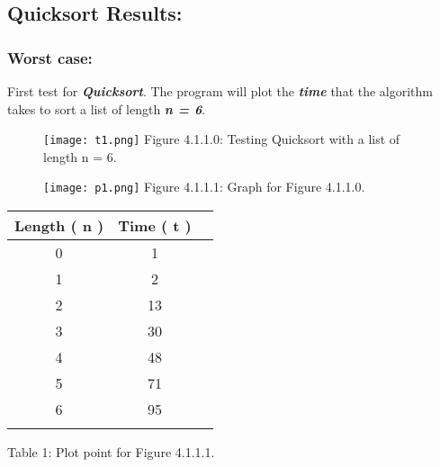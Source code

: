 \subsection{Quicksort Results:}

\subsubsection{Worst case:}

First test for {\bfseries\itshape Quicksort}. The program will plot the {\bfseries\itshape time} that the algorithm takes to sort a list of length {\bfseries\itshape n = 6}. \hfill \break

{\bfseries\itshape\color{armygreen}{Observation:}} {\itshape\color{armygreen}{We are going to analyze the worst case when the list it's sorted in decreasing order.}} \hfill \break

\begin{figure}[H]
\texttt{[image: t1.png]}
\centering \linebreak \linebreak Figure 4.1.1.0: Testing Quicksort with a list of length n = 6.
\end{figure} \hfill 

\begin{multicols}{2}
\begin{figure}[H]
\texttt{[image: p1.png]}
\centering \linebreak \linebreak Figure 4.1.1.1: Graph for Figure 4.1.1.0.
\end{figure} \hfill

\begin{center}
\begin{itemize}

\end{itemize}
{\Large
\begin{tabular}[.5cm]{ c c c }
\toprule
Length ( n ) & Time ( t ) \\
\midrule
0 & 1 \\
\cmidrule {1-2}
1 & 2 \\
\cmidrule {1-2}
2 & 13 \\
\cmidrule {1-2}
3 & 30 \\
\cmidrule {1-2}
4 & 48 \\
\cmidrule {1-2}
5 & 71 \\
\cmidrule {1-2}
6 & 95 \\
\bottomrule
\linebreak
\end{tabular}}
\linebreak \linebreak Table 1: Plot point for Figure 4.1.1.1.
\end{center}
\end{multicols}

